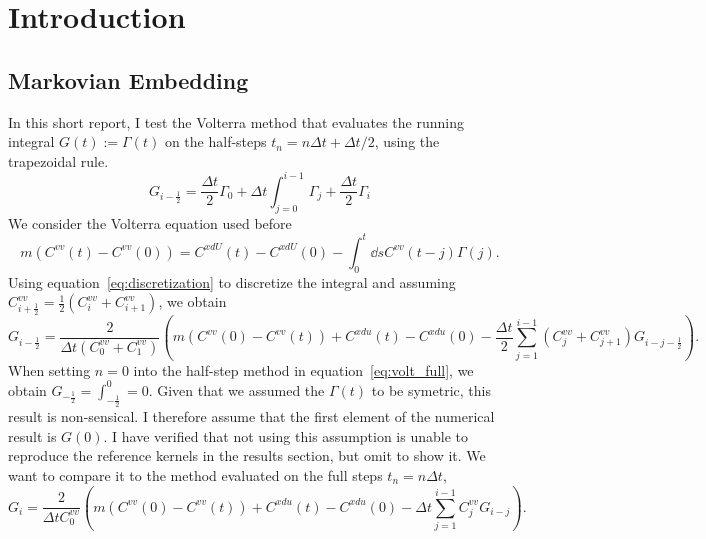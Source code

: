 \documentclass[11pt]{article}
\begin{document}

\section{Introduction}
\subsection{Markovian Embedding}
In this short report, I test the Volterra method that evaluates
the running integral $G(t) := \Gamma(t)$ on the half-steps $t_n = n\Delta t + \Delta t/2$,
using the trapezoidal rule.
\begin{equation}
    G_{i - \frac{1}{2}} = \frac{\Delta t}{2} \Gamma_0
        + \Delta t \int_{j=0}^{i - 1} \Gamma_j
        + \frac{\Delta t}{2} \Gamma_{i}
    \label{eq:discretization}
\end{equation}
We consider the Volterra equation used before
\begin{equation}
    m \left( C^{vv}(t) - C^{vv}(0) \right) =
        C^{xdU}(t) - C^{xdU}(0) - \int_{0}^{t} \dd s C^{vv}(t - j) \Gamma(j).
\end{equation}
Using equation~\ref{eq:discretization} to discretize the integral and assuming
$C^{vv}_{i + \frac{1}{2}} = \frac{1}{2} \left(C^{vv}_{i} + C^{vv}_{i + 1} \right)$, we obtain
\begin{equation}
    G_{i - \frac{1}{2}} = \frac{2}{\Delta t (C^{vv}_0 + C^{vv}_1)} \left(
        m \left( C^{vv}(0) - C^{vv}(t) \right) + C^{xdu}(t) - C^{xdu}(0)
        - \frac{\Delta t}{2} \sum_{j = 1}^{i - 1} (C^{vv}_j + C^{vv}_{j + 1}) G_{i - j - \frac{1}{2}}
        \right).
    \label{eq:volt_half}
\end{equation}
When setting $n = 0$ into the half-step method in equation~\ref{eq:volt_full}, we obtain
$G_{- \frac{1}{2}} = \int_{-\frac{1}{2}}^{0} = 0$. Given that we assumed the $\Gamma(t)$
to be symetric, this result is non-sensical. I therefore assume that the first element of
the numerical result is $G(0)$. I have verified that not using this assumption is unable to reproduce
the reference kernels in the results section, but omit to show it.
We want to compare it to the method evaluated on the full steps $t_n = n\Delta t$,
\begin{equation}
    G_{i} = \frac{2}{\Delta t C^{vv}_0} \left(
        m \left( C^{vv}(0) - C^{vv}(t) \right) + C^{xdu}(t) - C^{xdu}(0)
        - \Delta t \sum_{j = 1}^{i - 1} C^{vv}_j G_{i - j}
        \right).
    \label{eq:volt_full}
\end{equation}
\end{document}
